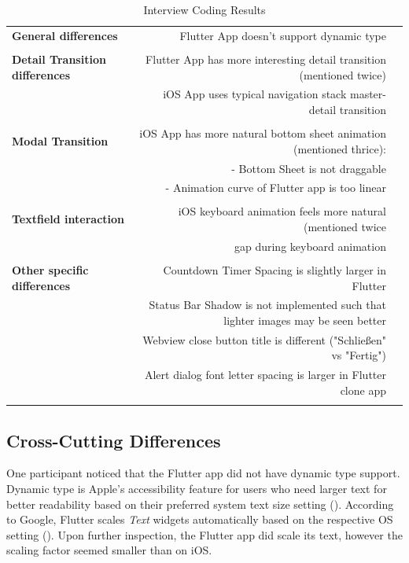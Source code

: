 \begin{table}[!htp]\centering
    \caption{Interview Coding Results}\label{tab:interview_coding_results}
    \scriptsize
    \begin{tabular}{lrr}\toprule
    \textbf{General differences} &Flutter App doesn't support dynamic type \\
    & \\
    \textbf{Detail Transition differences} &Flutter App has more interesting detail transition (mentioned twice) \\
    &iOS App uses typical navigation stack master-detail transition \\
    & \\
    \textbf{Modal Transition} &iOS App has more natural bottom sheet animation (mentioned thrice): \\
    &- Bottom Sheet is not draggable \\
    &- Animation curve of Flutter app is too linear \\
    \textbf{} & \\
    \textbf{Textfield interaction} &iOS keyboard animation feels more natural (mentioned twice \\
    &gap during keyboard animation \\
    & \\
    \textbf{Other specific differences} &Countdown Timer Spacing is slightly larger in Flutter \\
    &Status Bar Shadow is not implemented such that lighter images may be seen better \\
    &Webview close button title is different ("Schließen" vs "Fertig") \\
    &Alert dialog font letter spacing is larger in Flutter clone app \\
    & \\
    \bottomrule
    \end{tabular}
\end{table}




\subsection{Cross-Cutting Differences}
One participant noticed that the Flutter app did not have dynamic type support. 
Dynamic type is Apple's accessibility feature for users who need larger text for better readability based on their preferred system text size setting (\cite{Apple2021b}).
According to Google, Flutter scales \textit{Text} widgets automatically based on the respective OS setting (\cite{Google2021a}).
Upon further inspection, the Flutter app did scale its text, however the scaling factor seemed smaller than on iOS.

